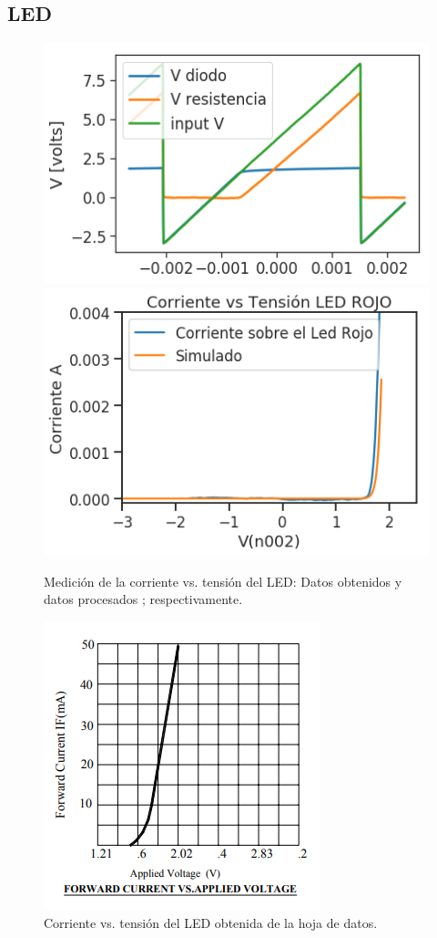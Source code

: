 
\subsection*{\color{orange}LED}

\begin{figure}[H]
\centering
\includegraphics[scale=0.5]{../EJ1/LED/datosOsciloscopioLED}
\includegraphics[scale=0.5]{../EJ1/LED/ledSuperpos}
\caption{Medici\'on de la corriente vs. tensi\'on del LED: Datos obtenidos y datos procesados ; respectivamente.}
\label{med3b}
\end{figure}

\begin{figure}[!ht]
\centering
\includegraphics[scale=0.8]{../EJ1/LED/LedDataSheet}
\caption{Corriente vs. tensi\'on del LED obtenida de la hoja de datos.}
\label{med3c}
\end{figure}
